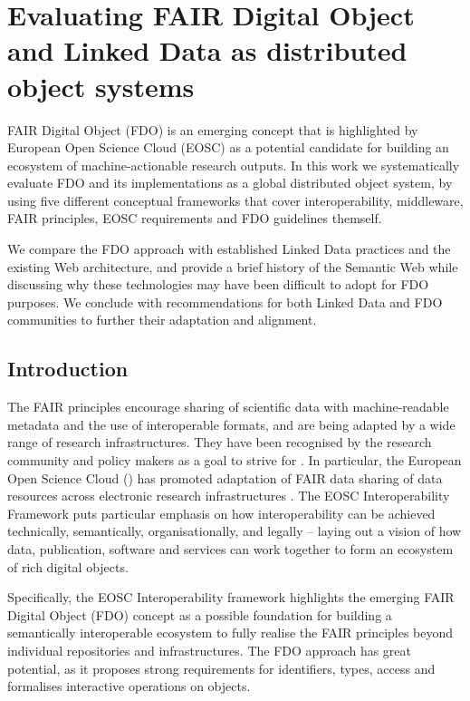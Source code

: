 \section{Evaluating FAIR Digital Object and Linked Data as distributed object systems}\label{ch3:evaluating-fdo-ld}

FAIR Digital Object (FDO) is an emerging concept that is highlighted by European Open Science Cloud (EOSC) as a potential candidate for building an ecosystem of machine-actionable research outputs. In this work we systematically evaluate FDO and its implementations as a global distributed object system, by using five different conceptual frameworks that cover interoperability, middleware, FAIR principles, EOSC requirements and FDO guidelines themself.

We compare the FDO approach with established Linked Data practices and the existing Web architecture, and provide a brief history of the Semantic Web while discussing why these technologies may have been difficult to adopt for FDO purposes. We conclude with recommendations for both Linked Data and FDO communities to further their adaptation and alignment.

\subsection{Introduction}\label{ch3:introduction}

The FAIR principles \cite{Wilkinson 2016} encourage sharing of scientific data with machine-readable metadata and the use of interoperable formats, and are being adapted by a wide range of research infrastructures. They have been recognised by the research community and policy makers as a goal to strive for \cite{h2020fair2016}. In particular, the European Open Science Cloud () has promoted adaptation of FAIR data sharing of data resources across electronic research infrastructures \cite{Mons 2017}. The EOSC Interoperability Framework \cite{eosc-interop-framework} puts particular emphasis on how interoperability can be achieved technically, semantically, organisationally, and legally -- laying out a vision of how data, publication, software and services can work together to form an ecosystem of rich digital objects.

Specifically, the EOSC Interoperability framework highlights the emerging FAIR Digital Object (FDO) concept \cite{schultesFAIRPrinciplesDigital2019a} as a possible foundation for building a semantically interoperable ecosystem to fully realise the FAIR principles beyond individual repositories and infrastructures. The FDO approach has great potential, as it proposes strong requirements for identifiers, types, access and formalises interactive operations on objects.

